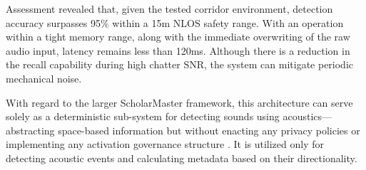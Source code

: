 \documentclass[conference]{IEEEtran}
\begin{document}
Assessment revealed that, given the tested corridor environment, detection accuracy surpasses 95\% within a 15m NLOS safety range. With an operation within a tight memory range, along with the immediate overwriting of the raw audio input, latency remains less than 120ms. Although there is a reduction in the recall capability during high chatter SNR, the system can mitigate periodic mechanical noise.

With regard to the larger ScholarMaster framework, this architecture can serve solely as a deterministic sub-system for detecting sounds using acoustics—abstracting space-based information but without enacting any privacy policies or implementing any activation governance structure . It is utilized only for detecting acoustic events and calculating metadata based on their directionality.
\end{document}
